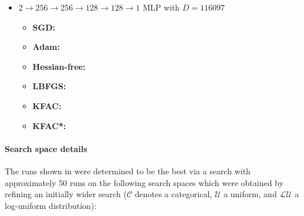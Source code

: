 \begin{itemize}
\item $2 \to 256 \to 256\to 128 \to 128 \to 1$ MLP with $D=\num{116097}$
  \begin{itemize}
    \def\pathToRuns{kfac_pinns_exp/exp23_heat1d_mlp_tanh_256/tex}
  \item \textbf{SGD:} 
  \item \textbf{Adam:} 
  \item \textbf{Hessian-free:} 
  \item \textbf{LBFGS:} 
  \item \textbf{KFAC:} 
  \item \textbf{KFAC*:} 
  \end{itemize}
\end{itemize}

\paragraph{Search space details} The runs shown in  were determined to be the best via a search with approximately 50 runs on the following search spaces which were obtained by refining an initially wider search ($\mathcal{C}$ denotes a categorical, $\mathcal{U}$ a uniform, and $\mathcal{LU}$ a log-uniform distribution):

